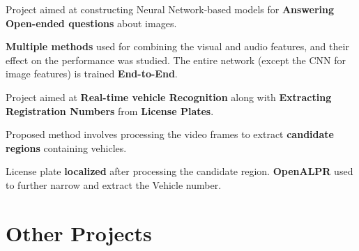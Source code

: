 \documentclass[a4paper]{norm-resume}
\begin{document}
	\vspace{1mm}

	\begin{tightitemize}
	\small
	{
	\item Project aimed at constructing Neural Network-based models for \textbf{Answering Open-ended questions} about images.
	\item \textbf{Multiple methods} used for combining the visual and audio features, and their effect on the performance was studied. The entire network (except the CNN for image features) is trained \textbf{End-to-End}.
	}
	\end{tightitemize}

	\vspace{1mm}

	\descript{Feb '16 - Apr '16}	
	\begin{tightitemize}
	\small
	{
	\item Project aimed at \textbf{Real-time vehicle Recognition} along with \textbf{Extracting Registration Numbers} from \textbf{License Plates}.
	\item Proposed method involves processing the video frames to extract \textbf{candidate regions} containing vehicles.
	\item License plate \textbf{localized} after processing the candidate region. \textbf{OpenALPR} used to further narrow and extract the Vehicle number.
	}
	\end{tightitemize}

	\vspace{1mm}
	

\section{Other Projects \hrulefill}

\vspace{1mm} %

 	

\vspace{1mm}

 	

\vspace{1mm}
\end{document}
